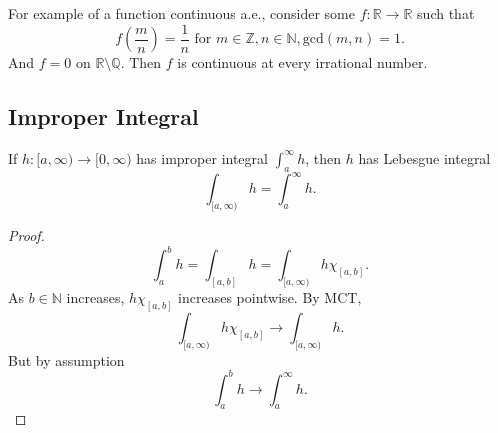 \begin{example}
	
For example of a function continuous a.e., consider some $f : \mathbb{R}\to \mathbb{R}$ such that
\[
	f\left(\frac{m}{n}\right) = \frac{1}{n} \text{ for } m \in \mathbb{Z}, n \in \mathbb{N}, \text{gcd}(m, n) = 1
.\] 
And $f = 0$ on $\mathbb{R}\setminus \mathbb{Q}$. Then $f$ is continuous at every irrational number.
\end{example}

\subsection{Improper Integral}

\begin{proposition}
	If $h: [a, \infty ) \to  [0,\infty )$ has improper integral $\int _a^{\infty }h$, then $h$ has Lebesgue integral
	\[
		\int _{[a, \infty  )} h = \int _a^\infty  h
	.\] 
\end{proposition}
\begin{proof}
	\[
		\int _a^b h = \int _{[a,b]}h = \int _{[a, \infty )} h \chi_{[a,b]}
	.\] 
	As $b \in \mathbb{N}$ increases, $h \chi_{[a,b]}$ increases pointwise. By MCT, 
	\[
		\int _{[a, \infty )} h \chi_{[a,b]}\to  \int _{[a, \infty )} h
	.\] 
	But by assumption
	\[
		\int _a^b h \to  \int _a^{\infty }h
	.\] 

\end{proof}

